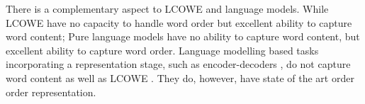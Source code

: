 \documentclass{book}
\begin{document}
There is a complementary aspect to LCOWE and language models.
While LCOWE have no capacity to handle word order but excellent ability to capture word content;
Pure language models have no ability to capture word content, but excellent ability to capture word order.
Language modelling based tasks incorporating a representation stage, such as encoder-decoders \citep{cho-EtAl:2014:EMNLP2014}, do not capture word content as well as LCOWE \citep{ac2018probingsentencevectors}.
They do, however, have state of the art order order representation.
%
%
%
%
%
%	
%	
%	
%	
%	
%			
%	
%	
%








\printbib
\end{document}
